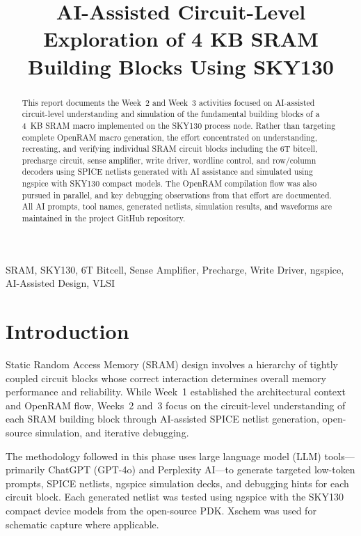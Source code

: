 \documentclass[conference]{IEEEtran}
\begin{document}
\title{\vspace{-0.8cm}
AI-Assisted Circuit-Level Exploration of 4 KB SRAM Building Blocks Using SKY130
\vspace{-0.5cm}}

\author{
}

\maketitle

\begin{abstract}
This report documents the Week~2 and Week~3 activities focused on AI-assisted circuit-level understanding and simulation of the fundamental building blocks of a 4~KB SRAM macro implemented on the SKY130 process node. Rather than targeting complete OpenRAM macro generation, the effort concentrated on understanding, recreating, and verifying individual SRAM circuit blocks including the 6T bitcell, precharge circuit, sense amplifier, write driver, wordline control, and row/column decoders using SPICE netlists generated with AI assistance and simulated using ngspice with SKY130 compact models. The OpenRAM compilation flow was also pursued in parallel, and key debugging observations from that effort are documented. All AI prompts, tool names, generated netlists, simulation results, and waveforms are maintained in the project GitHub repository.
\end{abstract}

\begin{IEEEkeywords}
SRAM, SKY130, 6T Bitcell, Sense Amplifier, Precharge, Write Driver, ngspice, AI-Assisted Design, VLSI
\end{IEEEkeywords}

\section{Introduction}
Static Random Access Memory (SRAM) design involves a hierarchy of tightly coupled circuit blocks whose correct interaction determines overall memory performance and reliability. While Week~1 established the architectural context and OpenRAM flow, Weeks~2 and~3 focus on the circuit-level understanding of each SRAM building block through AI-assisted SPICE netlist generation, open-source simulation, and iterative debugging.

The methodology followed in this phase uses large language model (LLM) tools---primarily ChatGPT (GPT-4o) and Perplexity AI---to generate targeted low-token prompts, SPICE netlists, ngspice simulation decks, and debugging hints for each circuit block. Each generated netlist was tested using ngspice with the SKY130 compact device models from the open-source PDK. Xschem was used for schematic capture where applicable.
\end{document}
